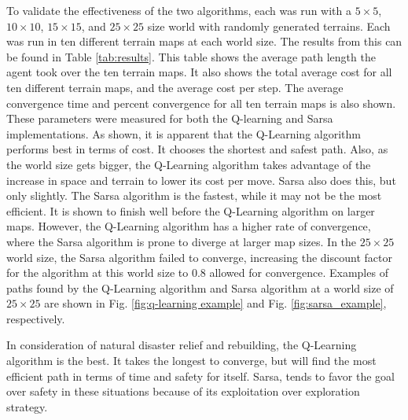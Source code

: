 \documentclass[12pt,american]{report}
\begin{document}
To validate the effectiveness of the two algorithms, each was run with a $5\times  5$, $10\times  10$, $15\times  15$, and $25\times  25$ size world with randomly generated terrains.  Each was run in ten different terrain maps at each world size.  The results from this can be found in Table \ref{tab:results}. This table shows the average path length the agent took over the ten terrain maps. It also shows the total average cost for all ten different terrain maps, and the average cost per step. The average convergence time and percent convergence for all ten terrain maps is also shown. These parameters were measured for both the Q-learning and Sarsa implementations.  As shown, it is apparent that the Q-Learning algorithm performs best in terms of cost.  It chooses the shortest and safest path. Also, as the world size gets bigger, the Q-Learning algorithm takes advantage of the increase in space and terrain to lower its cost per move. Sarsa also does this, but only slightly.  The Sarsa algorithm is the fastest, while it may not be the most efficient.  It is shown to finish well before the Q-Learning algorithm on larger maps.  However, the Q-Learning algorithm has a higher rate of convergence, where the Sarsa algorithm is prone to diverge at larger map sizes.  In the $25\times  25$ world size, the Sarsa algorithm failed to converge, increasing the discount factor for the algorithm at this world size to 0.8 allowed for convergence. Examples of paths found by the Q-Learning algorithm and Sarsa algorithm at a world size of $25\times  25$ are shown in Fig. \ref{fig:q-learning example} and Fig. \ref{fig:sarsa_example}, respectively.

In consideration of natural disaster relief and rebuilding, the Q-Learning algorithm is the best.  It takes the longest to converge, but will find the most efficient path in terms of time and safety for itself.  Sarsa, tends to favor the goal over safety in these situations because of its exploitation over exploration strategy. 
\end{document}
